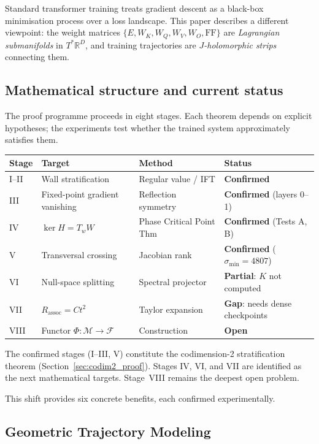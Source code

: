 \documentclass[11pt]{amsart}
\begin{document}
Standard transformer training treats gradient descent as a black-box
minimisation process over a loss landscape.
This paper describes a different viewpoint: the weight matrices
$\{E, W_K, W_Q, W_V, W_O, \mathrm{FF}\}$
are \emph{Lagrangian submanifolds} in $T^*\mathbb{R}^D$,
and training trajectories are \emph{$J$-holomorphic strips} connecting them.

\subsection*{Mathematical structure and current status}

The proof programme proceeds in eight stages.
Each theorem depends on explicit hypotheses; the experiments test
whether the trained system approximately satisfies them.

\begin{center}
\small
\begin{tabular}{@{}llll@{}}
\toprule
Stage & Target & Method & Status \\
\midrule
I--II & Wall stratification & Regular value / IFT & \textbf{Confirmed} \\
III   & Fixed-point gradient vanishing & Reflection symmetry & \textbf{Confirmed} (layers 0--1) \\
IV    & $\ker H = T_w W$ & Phase Critical Point Thm & \textbf{Confirmed} (Tests A, B) \\
V     & Transversal crossing & Jacobian rank & \textbf{Confirmed} ($\sigma_\mathrm{min}=4807$) \\
VI    & Null-space splitting & Spectral projector & \textbf{Partial}: $K$ not computed \\
VII   & $R_\mathrm{assoc} = Ct^2$ & Taylor expansion & \textbf{Gap}: needs dense checkpoints \\
VIII  & Functor $\Phi: \mathcal{M}\to\mathcal{F}$ & Construction & \textbf{Open} \\
\bottomrule
\end{tabular}
\end{center}

The confirmed stages (I--III, V) constitute the codimension-2 stratification
theorem (Section~\ref{sec:codim2_proof}).
Stages IV, VI, and VII are identified as the next mathematical targets.
Stage~VIII remains the deepest open problem.

This shift provides six concrete benefits, each confirmed experimentally.

\subsection{Geometric Trajectory Modeling}
\end{document}
